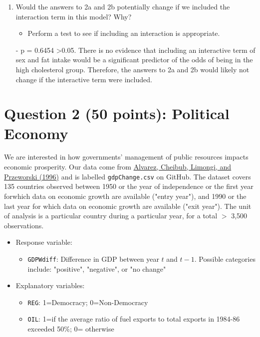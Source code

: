 \documentclass[12pt,letterpaper]{article}
\begin{document}
\begin{enumerate}
\begin{enumerate}
		\item
		Would the answers to 2a and 2b potentially change if we included the interaction term in this model? Why? 
		\begin{itemize}
			\item Perform a test to see if including an interaction is appropriate.
		\end{itemize}
		\item [-] p = 0.6454 \textgreater 0.05. There is no evidence that including an interactive term of sex and fat intake would be a significant predictor of the odds of being in the high cholesterol group. Therefore, the answers to 2a and 2b would likely not change if the interactive term were included.
		
	
		
	\end{enumerate}
\end{enumerate}
\newpage


\section*{Question 2 (50 points): Political Economy}
\vspace{.25cm}
\noindent We are interested in how governments' management of public resources impacts economic prosperity. Our data come from \href{https://www.researchgate.net/profile/Adam_Przeworski/publication/240357392_Classifying_Political_Regimes/links/0deec532194849aefa000000/Classifying-Political-Regimes.pdf}{Alvarez, Cheibub, Limongi, and Przeworski (1996)} and is labelled \texttt{gdpChange.csv} on GitHub. The dataset covers 135 countries observed between 1950 or the year of independence or the first year forwhich data on economic growth are available ("entry year"), and 1990 or the last year for which data on economic growth are available ("exit year"). The unit of analysis is a particular country during a particular year, for a total $>$ 3,500 observations. 

\begin{itemize}
	\item
	Response variable: 
	\begin{itemize}
		\item \texttt{GDPWdiff}: Difference in GDP between year $t$ and $t-1$. Possible categories include: "positive", "negative", or "no change"
	\end{itemize}
	\item
	Explanatory variables: 
	\begin{itemize}
		\item
		\texttt{REG}: 1=Democracy; 0=Non-Democracy
		\item
		\texttt{OIL}: 1=if the average ratio of fuel exports to total exports in 1984-86 exceeded 50\%; 0= otherwise
	\end{itemize}
	
\end{itemize}
\end{document}
